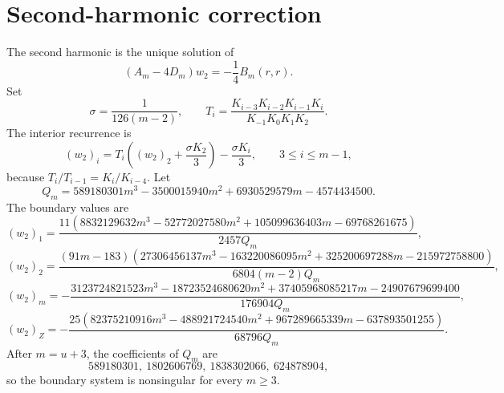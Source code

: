 \section*{Second-harmonic correction}
The second harmonic is the unique solution of
\[
(A_m-4D_m)w_2=-\frac14B_m(r,r).
\]
Set
\[
\sigma=\frac1{126(m-2)},
\qquad
T_i=\frac{K_{i-3}K_{i-2}K_{i-1}K_i}{K_{-1}K_0K_1K_2}.
\]
The interior recurrence is
\[
(w_2)_i=T_i\left((w_2)_2+\frac{\sigma K_2}{3}\right)
-\frac{\sigma K_i}{3},
\qquad 3\le i\le m-1,
\]
because $T_i/T_{i-1}=K_i/K_{i-4}$.  Let
\[
Q_m=589180301m^3-3500015940m^2+6930529579m-4574434500.
\]
The boundary values are
\[
(w_2)_1=\frac{11(8832129632m^3-52772027580m^2+105099636403m-69768261675)}{2457Q_m},
\]
\[
(w_2)_2=\frac{(91m-183)(27306456137m^3-163220086095m^2+325200697288m-215972758800)}{6804(m-2)Q_m},
\]
\[
(w_2)_m=-\frac{3123724821523m^3-18723524680620m^2+37405968085217m-24907679699400}{176904Q_m},
\]
\[
(w_2)_Z=-\frac{25(82375210916m^3-488921724540m^2+967289665339m-637893501255)}{68796Q_m}.
\]
After $m=u+3$, the coefficients of $Q_m$ are
\[
589180301,\ 1802606769,\ 1838302066,\ 624878904,
\]
so the boundary system is nonsingular for every $m\ge3$.
